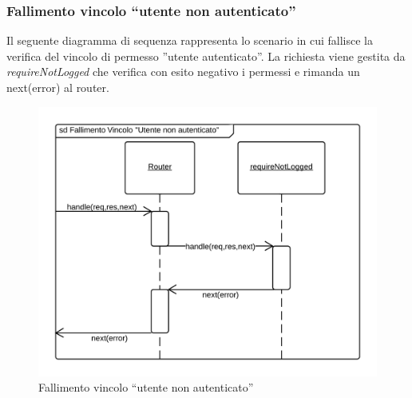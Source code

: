 \subsubsection{Fallimento vincolo ``utente non autenticato''}
Il seguente diagramma di sequenza rappresenta lo scenario in cui fallisce la verifica del vincolo di permesso ''utente autenticato''.
La richiesta viene gestita da \emph{requireNotLogged} che verifica con esito negativo i permessi e rimanda un next(error) al router.
\begin{figure}[H]
	\begin{center} 
		\includegraphics[scale=0.20]{scenari/requireNotLogged ERROR.png} 
		\caption{Fallimento vincolo ``utente non autenticato''}
	\end{center} 
\end{figure}

\pagebreak

